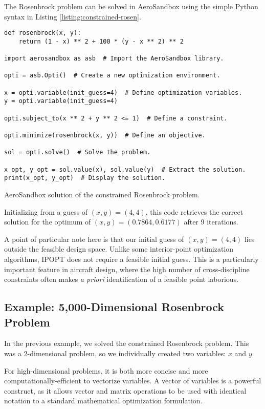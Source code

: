 The Rosenbrock problem can be solved in AeroSandbox using the simple Python syntax in Listing \ref{listing:constrained-rosen}.

\begin{listing}[H]
    \begin{verbatim}
def rosenbrock(x, y):
    return (1 - x) ** 2 + 100 * (y - x ** 2) ** 2

import aerosandbox as asb  # Import the AeroSandbox library.

opti = asb.Opti()  # Create a new optimization environment.

x = opti.variable(init_guess=4)  # Define optimization variables.
y = opti.variable(init_guess=4)

opti.subject_to(x ** 2 + y ** 2 <= 1)  # Define a constraint.

opti.minimize(rosenbrock(x, y))  # Define an objective.

sol = opti.solve()  # Solve the problem.

x_opt, y_opt = sol.value(x), sol.value(y)  # Extract the solution.
print(x_opt, y_opt)  # Display the solution.
    \end{verbatim}
    \caption{AeroSandbox solution of the constrained Rosenbrock problem.}
    \label{listing:constrained-rosen}
\end{listing}

Initializing from a guess of $(x, y) = (4, 4)$, this code retrieves the correct solution for the optimum of $(x, y) = (0.7864, 0.6177)$ after 9 iterations.

A point of particular note here is that our initial guess of $(x, y) = (4, 4)$ lies outside the feasible design space. Unlike some interior-point optimization algorithms, IPOPT does not require a feasible initial guess. This is a particularly important feature in aircraft design, where the high number of cross-discipline constraints often makes \textit{a priori} identification of a feasible point laborious.

\subsection{Example: 5,000-Dimensional Rosenbrock Problem}

In the previous example, we solved the constrained Rosenbrock problem. This was a 2-dimensional problem, so we individually created two variables: $x$ and $y$.

For high-dimensional problems, it is both more concise and more computationally-efficient to vectorize variables. A vector of variables is a powerful construct, as it allows vector and matrix operations to be used with identical notation to a standard mathematical optimization formulation.

